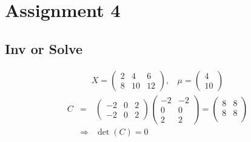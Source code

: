 \documentclass[a4paper,11pt]{article}
\begin{document}
\section*{Assignment 4}
\subsection*{Inv or Solve}


\begin{eqnarray*}
X=
\left(
\begin{array}{cccc}
2 & 4 & 6 \\
8 & 10 & 12  
\end{array}
\right)
, \:\:\:\:
\mu = 
\left(
\begin{array}{cccc}
4  \\
10  
\end{array}
\right) 
\end{eqnarray*}
\begin{eqnarray*}
C &=&
\left(
\begin{array}{cccc}
-2 & 0 & 2 \\
-2 & 0 & 2  
\end{array}
\right) 
\left(
\begin{array}{cccc}
-2 & -2\\
0 & 0 \\
2 & 2  
\end{array}
\right) 
= 
\left(
\begin{array}{cccc}
8 & 8\\
8 & 8 \\  
\end{array}
\right) \\
&\Rightarrow& \det(C) =0
\end{eqnarray*}
\end{document}
